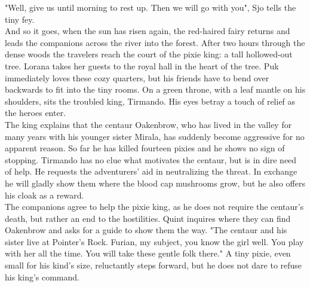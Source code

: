 "Well, give us until morning to rest up. Then we will go with you", Sjo tells the tiny fey.\\

And so it goes, when the sun has risen again, the red-haired fairy returns and leads the companions across the river into the forest. After two hours through the dense woods the travelers reach the court of the pixie king: a tall hollowed-out tree. Lorana takes her guests to the royal hall in the heart of the tree. Puk immediately loves these cozy quarters, but his friends have to bend over backwards to fit into the tiny rooms. On a green throne, with a leaf mantle on his shoulders, sits the troubled king, Tirmando. His eyes betray a touch of relief as the heroes enter.\\

The king explains that the centaur Oakenbrow, who has lived in the valley for many years with his younger sister Mirala, has suddenly become aggressive for no apparent reason. So far he has killed fourteen pixies and he shows no sign of stopping. Tirmando has no clue what motivates the centaur, but is in dire need of help. He requests the adventurers' aid in neutralizing the threat. In exchange he will gladly show them where the blood cap mushrooms grow, but he also offers his cloak as a reward.\\

The companions agree to help the pixie king, as he does not require the centaur's death, but rather an end to the hostilities. Quint inquires where they can find Oakenbrow and asks for a guide to show them the way. "The centaur and his sister live at Pointer's Rock. Furian, my subject, you know the girl well. You play with her all the time. You will take these gentle folk there." A tiny pixie, even small for his kind's size, reluctantly steps forward, but he does not dare to refuse his king's command.\\

